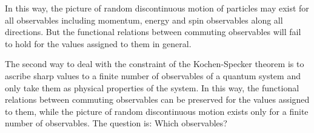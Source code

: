 In this way, the picture of random discontinuous motion of particles may exist for all observables including momentum, energy and spin observables along all directions. But the functional relations between commuting observables will fail to hold for the values assigned to them in general.

The second way to deal with the constraint of the Kochen-Specker theorem is to ascribe sharp values to a finite number of observables of a quantum system and only take them as physical properties of the system.
In this way, the functional relations between commuting observables can be preserved for the values assigned to them, while the picture of random discontinuous motion exists only for a finite number of observables.
The question is: Which observables?

